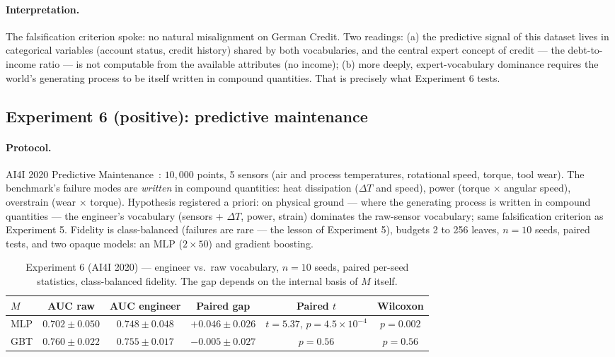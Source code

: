 \documentclass[10pt]{article}
\theoremstyle{definition}
\theoremstyle{plain}
\begin{document}
\paragraph{Interpretation.} The falsification criterion spoke: no natural misalignment on German Credit. Two readings: (a) the predictive signal of this dataset lives in categorical variables (account status, credit history) shared by both vocabularies, and the central expert concept of credit --- the debt-to-income ratio --- is not computable from the available attributes (no income); (b) more deeply, expert-vocabulary dominance requires the world's generating process to be itself written in compound quantities. That is precisely what Experiment 6 tests.

\subsection{Experiment 6 (positive): predictive maintenance}
\label{sec:exp6}

\paragraph{Protocol.} AI4I 2020 Predictive Maintenance~\citep{matzka2020explainable}: $10{,}000$ points, 5 sensors (air and process temperatures, rotational speed, torque, tool wear). The benchmark's failure modes are \emph{written} in compound quantities: heat dissipation ($\Delta T$ and speed), power (torque $\times$ angular speed), overstrain (wear $\times$ torque). Hypothesis registered a priori: on physical ground --- where the generating process is written in compound quantities --- the engineer's vocabulary (sensors + $\Delta T$, power, strain) dominates the raw-sensor vocabulary; same falsification criterion as Experiment 5. Fidelity is class-balanced (failures are rare --- the lesson of Experiment 5), budgets 2 to 256 leaves, $n = 10$ seeds, paired tests, and two opaque models: an MLP ($2 \times 50$) and gradient boosting.

\begin{table}[t]
\centering
\footnotesize
\caption{Experiment 6 (AI4I 2020) --- engineer vs.\ raw vocabulary, $n = 10$ seeds, paired per-seed statistics, class-balanced fidelity. The gap depends on the internal basis of $M$ itself.}
\label{tab:exp6}
\begin{tabular}{lccccc}
\toprule
$M$ & AUC raw & AUC engineer & Paired gap & Paired $t$ & Wilcoxon \\
\midrule
MLP & $0.702{\pm}0.050$ & $0.748{\pm}0.048$ & $\mathbf{+0.046{\pm}0.026}$ & $t = 5.37$, $p = 4.5{\times}10^{-4}$ & $p = 0.002$ \\
GBT & $0.760{\pm}0.022$ & $0.755{\pm}0.017$ & $-0.005{\pm}0.027$ & $p = 0.56$ & $p = 0.56$ \\
\bottomrule
\end{tabular}
\end{table}
\end{document}
